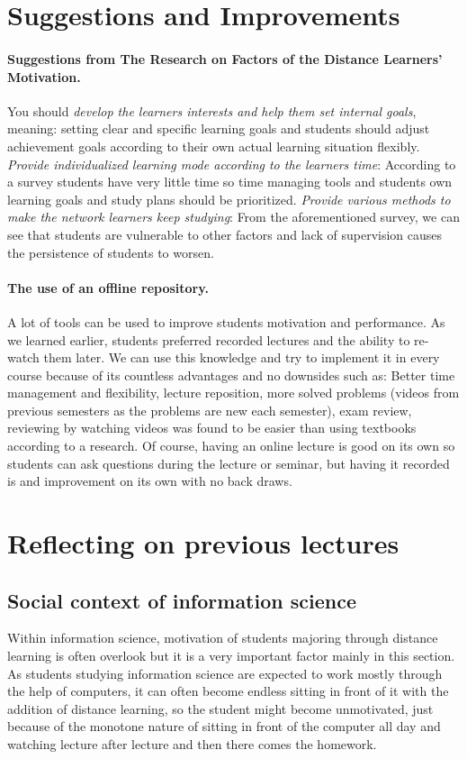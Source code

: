 \documentclass[10pt,twoside,english,a4paper]{article}
\begin{document}
\section{Suggestions and Improvements}
\paragraph{Suggestions from The Research on Factors of the Distance Learners' Motivation.}\cite{yubing}
You should \textit{develop the learners interests and help them set internal goals}, meaning: setting clear and specific learning goals and students should adjust achievement goals according to their own actual learning situation flexibly.
\textit{Provide individualized learning mode according to the learners time}: According to a survey\cite{yubing} students have very little time so time managing tools and students own learning goals and study plans should be prioritized. \textit{Provide various methods to make the network learners keep studying}: From the aforementioned survey, we can see that students are vulnerable to other factors and lack of supervision causes the persistence of students to worsen.
\paragraph{The use of an offline repository.}\cite{Rodriguez-Paz}
A lot of tools can be used to improve students motivation and performance. As we learned earlier, students preferred recorded lectures and the ability to re-watch them later. We can use this knowledge and try to implement it in every course because of its countless advantages and no downsides such as: Better time management and flexibility, lecture reposition, more solved problems (videos from previous semesters as the problems are new each semester), exam review, reviewing by watching videos was found to be easier than using textbooks according to a research.\cite{Rodriguez-Paz} Of course, having an online lecture is good on its own so students can ask questions during the lecture or seminar, but having it recorded is and improvement on its own with no back draws.

\section{Reflecting on previous lectures}
\subsection{Social context of information science}
Within information science, motivation of students majoring through distance learning is often overlook but it is a very important factor mainly in this section. As students studying information science are expected to work mostly through the help of computers, it can often become endless sitting in front of it with the addition of distance learning, so the student might become unmotivated, just because of the monotone nature of sitting in front of the computer all day and watching lecture after lecture and then there comes the homework. 
\end{document}
